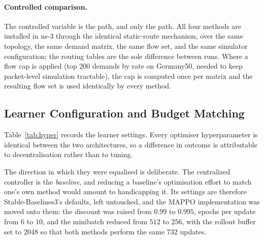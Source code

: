 \paragraph{Controlled comparison.} The controlled variable is the path, and only
the path. All four methods are installed in ns-3 through the identical
static-route mechanism, over the same topology, the same demand matrix, the same
flow set, and the same simulator configuration; the routing tables are the sole
difference between runs. Where a flow cap is applied (top $200$ demands by rate
on Germany50, needed to keep packet-level simulation tractable), the cap is
computed once per matrix and the resulting flow set is used identically by every
method.

\subsection{Learner Configuration and Budget Matching}
\label{sec:setup-hyper}

Table~\ref{tab:hyper} records the learner settings. Every optimiser
hyperparameter is identical between the two architectures, so a difference in
outcome is attributable to decentralisation rather than to tuning.

The direction in which they were equalised is deliberate. The centralized
controller is the \emph{baseline}, and reducing a baseline's optimisation effort
to match one's own method would amount to handicapping it. Its settings are
therefore Stable-Baselines3's defaults, left untouched, and the MAPPO
implementation was moved onto them: the discount was raised from $0.99$ to
$0.995$, epochs per update from $6$ to $10$, and the minibatch reduced from $512$
to $256$, with the rollout buffer set to $2048$ so that both methods perform the
same $732$ updates.

